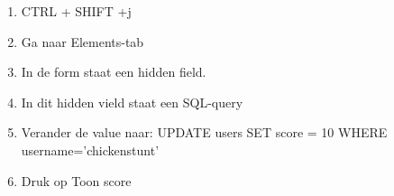 \begin{enumerate}
  \item CTRL + SHIFT +j
  \item Ga naar Elements-tab
  \item In de form staat een hidden field.
  \item In dit hidden vield staat een SQL-query
  \item Verander de value naar: UPDATE users SET score = 10 WHERE username='chickenstunt'
  \item Druk op Toon score
\end{enumerate}